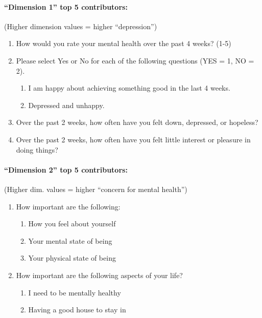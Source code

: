 \documentclass[
]{report}
\let\oldparagraph\paragraph
\renewcommand{\paragraph}[1]{\oldparagraph{#1}\mbox{}}
\providecommand{\tightlist}{%
  \setlength{\itemsep}{0pt}\setlength{\parskip}{0pt}}\usepackage{longtable,booktabs,array}
\begin{document}
\hypertarget{dimension-1-top-5-contributors}{%
\paragraph{``Dimension 1'' top 5
contributors:}\label{dimension-1-top-5-contributors}}

(Higher dimension values = higher ``depression'')

\begin{enumerate}
\def\labelenumi{\arabic{enumi}.}
\tightlist
\item
  How would you rate your mental health over the past 4 weeks? (1-5)
\item
  Please select Yes or No for each of the following questions (YES = 1,
  NO = 2).

  \begin{enumerate}
  \def\labelenumii{\alph{enumii}.}
  \tightlist
  \item
    I am happy about achieving something good in the last 4 weeks.
  \item
    Depressed and unhappy.
  \end{enumerate}
\item
  Over the past 2 weeks, how often have you felt down, depressed, or
  hopeless?
\item
  Over the past 2 weeks, how often have you felt little interest or
  pleasure in doing things?
\end{enumerate}

\hypertarget{dimension-2-top-5-contributors}{%
\paragraph{``Dimension 2'' top 5
contributors:}\label{dimension-2-top-5-contributors}}

(Higher dim. values = higher ``concern for mental health'')

\begin{enumerate}
\def\labelenumi{\arabic{enumi}.}
\tightlist
\item
  How important are the following:

  \begin{enumerate}
  \def\labelenumii{\alph{enumii}.}
  \tightlist
  \item
    How you feel about yourself
  \item
    Your mental state of being
  \item
    Your physical state of being
  \end{enumerate}
\item
  How important are the following aspects of your life?

  \begin{enumerate}
  \def\labelenumii{\alph{enumii}.}
  \tightlist
  \item
    I need to be mentally healthy
  \item
    Having a good house to stay in
  \end{enumerate}
\end{enumerate}
\end{document}
